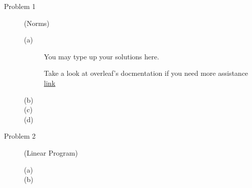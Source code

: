 \documentclass[11pt]{article}
\begin{document}
\begin{description}
\item[Problem 1] (Norms) 

\begin{description}
    \item[(a)] 
    
    You may type up your solutions here.
    
    Take a look at overleaf's docmentation if you need more assistance \href{https://www.overleaf.com/learn/latex/Main_Page}{link} 
    
    \item[(b)] 
    \item[(c)]
    \item[(d)]
\end{description}

\item[Problem 2]  (Linear Program)

\begin{description}
    \item[(a)] 
    \item[(b)] 

\end{description}


\end{description}
\end{document}
